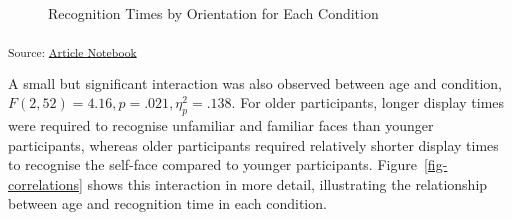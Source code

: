 \documentclass[
  authoryear,
  review,
  3p,
  onecolumn]{elsarticle}
\begin{document}
\label{cell-fig-recognition-times}
\begin{figure}[H]


\caption{\label{fig-recognition-times}Recognition Times by Orientation
for Each Condition}

\end{figure}%

\textsubscript{Source:
\href{https://deborahapthorp.github.io/SelfFaceManuscript/index.qmd.html}{Article
Notebook}}

A small but significant interaction was also observed between age and
condition, \(F(2, 52) = 4.16, p = .021, \eta_p^2 = .138\). For older
participants, longer display times were required to recognise unfamiliar
and familiar faces than younger participants, whereas older participants
required relatively shorter display times to recognise the self-face
compared to younger participants. Figure~\ref{fig-correlations} shows
this interaction in more detail, illustrating the relationship between
age and recognition time in each condition.
\end{document}
